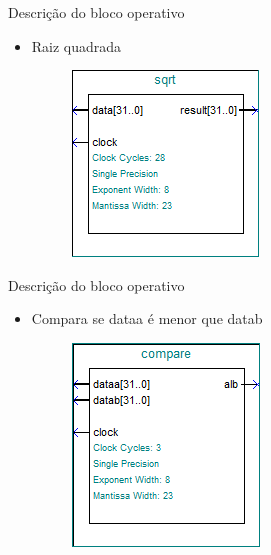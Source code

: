 \documentclass[11pt]{beamer}
\begin{document}
\begin{frame}{Descrição do bloco operativo}
	\begin{itemize}
	\item Raiz quadrada
	\begin{figure}[ht]
	\centering
	\includegraphics[width=.5\textwidth]{sqrt}
	\label{fig:sqrt}
	\end{figure}
	\end{itemize}
\end{frame}

\begin{frame}{Descrição do bloco operativo}
	\begin{itemize}
	\item Compara se dataa é menor que datab
	\begin{figure}[ht]
	\centering
	\includegraphics[width=.5\textwidth]{compare}
	\label{fig:compare}
	\end{figure}
	\end{itemize}
\end{frame}
\end{document}
